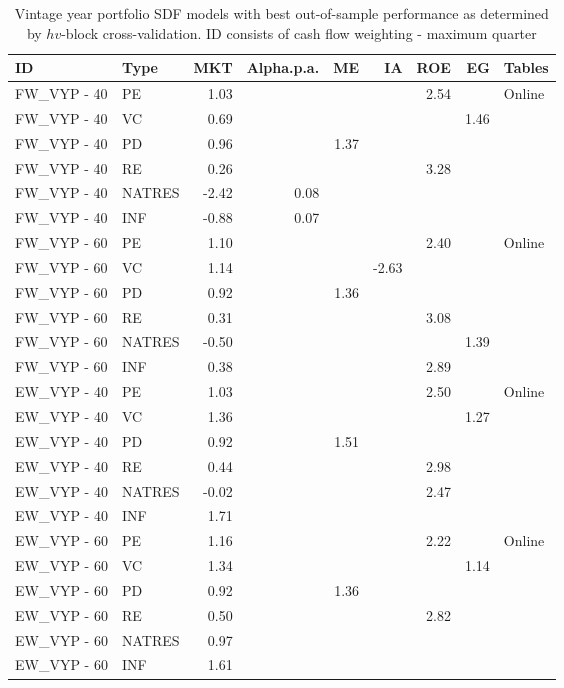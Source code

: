 \documentclass[12pt]{article}
\begin{document}
\begin{table}[ht]
	\centering
	\begin{tabular}{llrrrrrrl}
		\hline
		ID & Type & MKT & Alpha.p.a. & ME & IA & ROE & EG & Tables \\ 
		\hline
		FW\_VYP - 40 & PE & 1.03 &  &  &  & 2.54 &  & Online \\ 
		FW\_VYP - 40 & VC & 0.69 &  &  &  &  & 1.46 &  \\ 
		FW\_VYP - 40 & PD & 0.96 &  & 1.37 &  &  &  &  \\ 
		FW\_VYP - 40 & RE & 0.26 &  &  &  & 3.28 &  &  \\ 
		FW\_VYP - 40 & NATRES & -2.42 & 0.08 &  &  &  &  &  \\ 
		FW\_VYP - 40 & INF & -0.88 & 0.07 &  &  &  &  &  \\ 
		\hline
		FW\_VYP - 60 & PE & 1.10 &  &  &  & 2.40 &  & Online \\ 
		FW\_VYP - 60 & VC & 1.14 &  &  & -2.63 &  &  &  \\ 
		FW\_VYP - 60 & PD & 0.92 &  & 1.36 &  &  &  &  \\ 
		FW\_VYP - 60 & RE & 0.31 &  &  &  & 3.08 &  &  \\ 
		FW\_VYP - 60 & NATRES & -0.50 &  &  &  &  & 1.39 &  \\ 
		FW\_VYP - 60 & INF & 0.38 &  &  &  & 2.89 &  &  \\ 
		\hline
		\hline
		EW\_VYP - 40 & PE & 1.03 &  &  &  & 2.50 &  & Online \\ 
		EW\_VYP - 40 & VC & 1.36 &  &  &  &  & 1.27 &  \\ 
		EW\_VYP - 40 & PD & 0.92 &  & 1.51 &  &  &  &  \\ 
		EW\_VYP - 40 & RE & 0.44 &  &  &  & 2.98 &  &  \\ 
		EW\_VYP - 40 & NATRES & -0.02 &  &  &  & 2.47 &  &  \\ 
		EW\_VYP - 40 & INF & 1.71 &  &  &  &  &  &  \\ 
		\hline
		EW\_VYP - 60 & PE & 1.16 &  &  &  & 2.22 &  & Online \\ 
		EW\_VYP - 60 & VC & 1.34 &  &  &  &  & 1.14 &  \\ 
		EW\_VYP - 60 & PD & 0.92 &  & 1.36 &  &  &  &  \\ 
		EW\_VYP - 60 & RE & 0.50 &  &  &  & 2.82 &  &  \\ 
		EW\_VYP - 60 & NATRES & 0.97 &  &  &  &  &  &  \\ 
		EW\_VYP - 60 & INF & 1.61 &  &  &  &  &  &  \\ 
		\hline
		\hline
	\end{tabular}
	\caption{Vintage year portfolio SDF models with best out-of-sample performance as determined by $hv$-block cross-validation. ID consists of cash flow weighting - maximum quarter} 
	\label{tab:result_summary_vyp}
\end{table}
\end{document}

